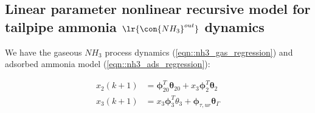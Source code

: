 \subsection{Linear parameter nonlinear recursive model for tailpipe ammonia $\lr{\con{NH_3}^{out}}$ dynamics}

We have the gaseous $NH_3$ process dynamics (\ref{eqn::nh3_gas_regression}) and adsorbed ammonia model (\ref{eqn::nh3_ads_regression}):

\begin{align*}
     x_2 (k+1) &= \pmb \phi_{20}^T \pmb \theta_{20} + x_3 \pmb \phi_2^T \pmb \theta_2\\
     x_3(k+1) &= x_3 \pmb \phi_3^T \theta_3 + \pmb \phi_{\tau, ur} \pmb \theta_\Gamma
 \end{align*}
